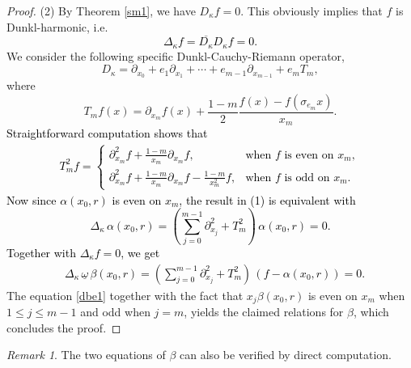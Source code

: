 \documentclass{amsart}
\theoremstyle{definition}
\theoremstyle{remark}
\newtheorem{remark}[theorem]{Remark}
\numberwithin{equation}{section}
\begin{document}
\begin{proof}
(2) By Theorem \ref{sm1},  we have $D_{\kappa}f=0$.  This obviously implies that  $f$ is Dunkl-harmonic, i.e.
\textcolor{black}{\begin{equation*}
    \Delta_{\kappa}f=\overline{D_{\kappa}} D_{\kappa}f=0.
\end{equation*}}
We consider the following specific Dunkl-Cauchy-Riemann operator,
\begin{equation*}
    D_{\kappa}= \partial_{x_{0}}+e_{1}\partial_{x_{1}} +\cdots+e_{m-1}\partial_{x_{m-1}}+e_{m}T_{m},
\end{equation*}
where  \begin{equation*}\displaystyle T_{m}f(x)=\partial_{x_{m}}f(x)+\frac{1-m}{2}\frac{f(x)-f(\sigma_{e_{m}}x)}{x_{m}}.\end{equation*}
\textcolor{black}{ Straightforward  computation shows that \begin{equation*}
    		\begin{split}
    			T_{m}^{2}f=\left\{
    			\begin{array}{ll}
    				 \displaystyle  \partial_{x_{m}}^{2}f+\frac{1-m}{x_{m}}\partial_{x_{m}}f, & \mbox{when $f$ is even on $x_{m}$} ,\\
    				\displaystyle \partial_{x_{m}}^{2}f+\frac{1-m}{x_{m}}\partial_{x_{m}}f-\frac{1-m}{x_{m}^{2}}f, & \mbox {when $f$ is odd on $x_{m}$}.
    			\end{array}
    			\right.
    		\end{split}
\end{equation*}
Now since $\alpha(x_{0}, r)$ is even on $x_{m}$, the result in (1) is equivalent with \[\Delta_{\kappa}\,\alpha(x_{0}, r)=
       \left(\sum_{j=0}^{m-1}\partial_{x_{j}}^{2}+T_{m}^{2}\right) \,\alpha(x_{0}, r)=0.\]
Together with $\Delta_{\kappa}f=0$, we get
\begin{equation} \label{dbe1}\begin{split}
       &\Delta_{\kappa}\,\underline{\omega}\,\beta(x_{0}, r)=
       \left(\sum_{j=0}^{m-1}\partial_{x_{j}}^{2}+T_{m}^{2}\right) \,(f-\alpha(x_{0},r))=0.
\end{split}
\end{equation}}
The equation \eqref{dbe1} together with the fact  that $x_{j}\beta(x_{0}, r)$ is even on $x_{m}$ when $1\le j\le m-1$ and odd when $j=m$, yields
 the claimed relations for $\beta$, which concludes the proof.
\end{proof}
\begin{remark} The two equations of $\beta$ can also be verified by direct computation.
\end{remark}
\end{document}
